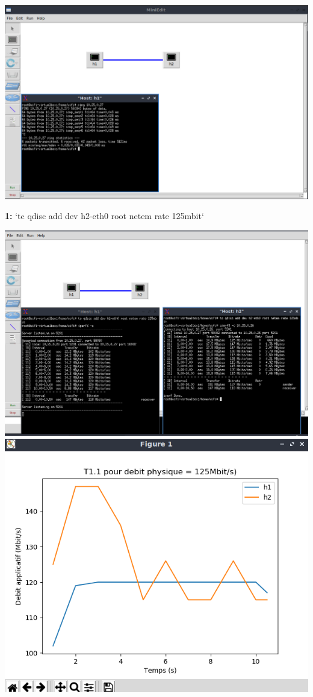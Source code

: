 \vspace{0.5cm}
\begin{center}
    \includegraphics[width=1\textwidth]{./images/T1.1/T1.1TopologyPing.png}
\end{center}
\textbf{1:} `tc qdisc add dev h2-eth0 root netem rate 125mbit`
\begin{center}
    \includegraphics[width=1\textwidth]{./images/T1.1/125test1.png}
    \includegraphics[width=1\textwidth]{./images/T1.1/courbe125test1.png}   
\end{center}
